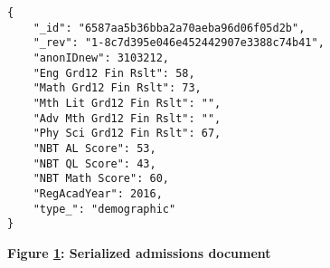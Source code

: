 \begin{figure}[H]
    \centering
    \begin{mdframed}
        \centering
        \begin{verbatim}
{
    "_id": "6587aa5b36bba2a70aeba96d06f05d2b",
    "_rev": "1-8c7d395e046e452442907e3388c74b41",
    "anonIDnew": 3103212,
    "Eng Grd12 Fin Rslt": 58,
    "Math Grd12 Fin Rslt": 73,
    "Mth Lit Grd12 Fin Rslt": "",
    "Adv Mth Grd12 Fin Rslt": "",
    "Phy Sci Grd12 Fin Rslt": 67,
    "NBT AL Score": 53,
    "NBT QL Score": 43,
    "NBT Math Score": 60,
    "RegAcadYear": 2016,
    "type_": "demographic"
}         
        \end{verbatim}
    \end{mdframed}
    \caption[Serialized admissions document]{\textbf{Figure \ref{fig-json-admission}: Serialized admissions document}}
    \label{fig-json-admission}
\end{figure}